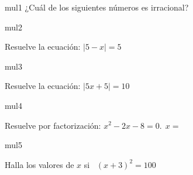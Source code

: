 \documentclass[a4paper]{article}
\begin{document}
\begin{question}{mul1}
¿Cuál de los siguientes números es irracional? 

\begin{choices}
        \end{choices}

\end{question}

\begin{question}{mul2}

Resuelve la ecuación: \( \left|  5-x  \right| =5\)

    \begin{choices}
    \end{choices}
    
\end{question}

\begin{question}{mul3}

    Resuelve la ecuación: \(\left| 5x+5 \right|= 10 \)
    
    \begin{choices}
    \end{choices}
    
\end{question}

\begin{question}{mul4}

     Resuelve por factorización:  \(x^2 - 2 x - 8  =0. \  \ x = \)
     
        \begin{choices}
        \end{choices}

\end{question}

\begin{question}{mul5}
    
Halla los valores de \(x\) si \   \((x+3)^2 = 100\)

        \begin{choices}
        \end{choices}
        
\end{question}
\end{document}

